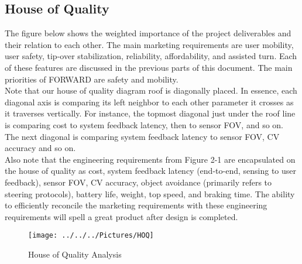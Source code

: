 \subsection{House of Quality}
\indent The figure below shows the weighted importance of the project deliverables and their relation to each other. The main marketing requirements are user mobility, user safety, tip-over stabilization, reliability, affordability, and assisted turn. Each of these features are discussed in the previous parts of this document. The main priorities of FORWARD are safety and mobility. 
\\


\noindent Note that our house of quality diagram roof is diagonally placed. In essence, each diagonal axis is comparing its left neighbor to each other parameter it crosses as it traverses vertically. For instance, the topmost diagonal just under the roof line is comparing cost to system feedback latency, then to sensor FOV, and so on. The next diagonal is comparing system feedback latency to sensor FOV, CV accuracy and so on. 
\\

\noindent
Also note that the engineering requirements from Figure 2-1 are encapsulated on the house of quality as cost, system feedback latency (end-to-end, sensing to user feedback), sensor FOV, CV accuracy, object avoidance (primarily refers to steering protocols), battery life, weight, top speed, and braking time. The ability to efficiently reconcile the marketing requirements with these engineering requirements will spell a great product after design is completed.\\

\begin{figure}
\centering
\texttt{[image: ../../../Pictures/HOQ]}
\caption{House of Quality Analysis}
\end{figure}